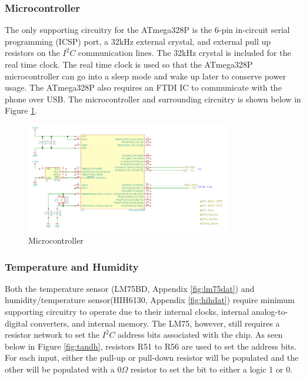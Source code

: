 \documentclass{article}
\numberwithin{figure}{section}
\numberwithin{equation}{section}
\begin{document}
{\subsubsection{Microcontroller}

The only supporting circuitry for the ATmega328P is the 6-pin in-circuit serial programming (ICSP) port, a 32kHz external crystal, and external pull up resistors on the $I^2 C$ communication lines. The 32kHz crystal is included for the real time clock. The real time clock is used so that the ATmega328P microcontroller can go into a sleep mode and wake up later to conserve power usage. The ATmega328P also requires an FTDI IC to communicate with the phone over USB. The microcontroller and surrounding circuitry is shown below in Figure \ref{fig:mcu}.
\begin{figure}[H]
	\centering
	\includegraphics[width=0.8\textwidth]{Microcontroller}
	\caption{Microcontroller}
	\label{fig:mcu}
\end{figure}

\subsubsection{Temperature and Humidity}

Both the temperature sensor (LM75BD, Appendix \ref{fig:lm75dat}) and humidity/temperature sensor(HIH6130, Appendix \ref{fig:hihdat}) require minimum supporting circuitry to operate due to their internal clocks, internal analog-to-digital converters, and internal memory. The LM75, however, still requires a resistor network to set the $I^2 C$ address bits associated with the chip. As seen below in Figure \ref{fig:tandh}, resistors R51 to R56 are used to set the address bits. For each input, either the pull-up or pull-down resistor will be populated and the other will be populated with a 0$\Omega$ resistor to set the bit to either a logic 1 or 0.

}
\end{document}
